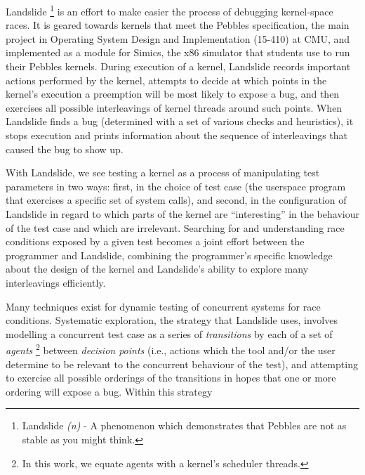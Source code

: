 \documentclass[12pt]{book}
\begin{document}


Landslide
\footnote{Landslide {\em (n)} - A phenomenon which demonstrates that Pebbles are not as stable as you might think.}
is an effort to make easier the process of debugging kernel-space races.
It is geared towards kernels that meet the Pebbles specification, the main project in Operating System Design and Implementation (15-410) at CMU, and implemented as a module for Simics, the x86 simulator that students use to run their Pebbles kernels.
During execution of a kernel, Landslide records important actions performed by the kernel, attempts to decide at which points in the kernel's execution a preemption will be most likely to expose a bug, and then exercises all possible interleavings of kernel threads around such points.
When Landslide finds a bug (determined with a set of various checks and heuristics), it stops execution and prints information about the sequence of interleavings that caused the bug to show up.

With Landslide, we see testing a kernel as a process of manipulating test parameters in two ways: first, in the choice of test case (the userspace program that exercises a specific set of system calls), and second, in the configuration of Landslide in regard to which parts of the kernel are ``interesting'' in the behaviour of the test case and which are irrelevant.
Searching for and understanding race conditions exposed by a given test becomes a joint effort between the programmer and Landslide, combining the programmer's specific knowledge about the design of the kernel and Landslide's ability to explore many interleavings efficiently.

Many techniques exist for dynamic testing of concurrent systems for race conditions.
Systematic exploration, the strategy that Landslide uses, involves modelling a concurrent test case as a series of {\em transitions} by each of a set of {\em agents}
\footnote{In this work, we equate agents with a kernel's scheduler threads.}
between {\em decision points} (i.e., actions which the tool and/or the user determine to be relevant to the concurrent behaviour of the test), and attempting to exercise all possible orderings of the transitions in hopes that one or more ordering will expose a bug.
Within this strategy
\end{document}
